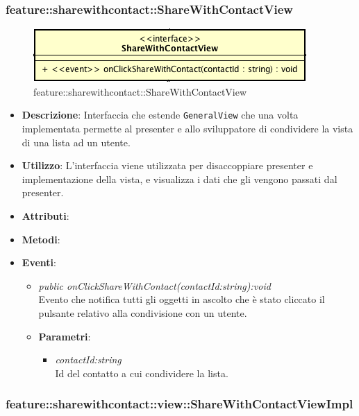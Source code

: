 \subsubsection{feature::sharewithcontact::ShareWithContactView}

\label{feature::sharewithcontact::ShareWithContactView}
\begin{figure}[ht]
	\centering
	\includegraphics[scale=0.5]{Sezioni/SottosezioniST/img/app/ShareWithContactView.png}
	\caption{feature::sharewithcontact::ShareWithContactView}
\end{figure}

\begin{itemize}
\item \textbf{Descrizione}: Interfaccia che estende \texttt{GeneralView} che una volta implementata permette al presenter e allo sviluppatore di condividere la vista di una lista ad un utente.
\item \textbf{Utilizzo}: L'interfaccia viene utilizzata per disaccoppiare presenter e implementazione della vista, e visualizza i dati che gli vengono passati dal presenter.
\item \textbf{Attributi}: 
\item \textbf{Metodi}:
\item \textbf{Eventi}:
\begin{itemize}
\item \textit{public onClickShareWithContact(contactId:string):void}\\
	Evento che notifica tutti gli oggetti in ascolto che è stato cliccato il pulsante relativo alla condivisione con un utente.
	\item{\textbf{Parametri}: \begin{itemize}
	\item \textit{contactId:string}\\
	Id del contatto a cui condividere la lista.
	\end{itemize}}
\end{itemize}
\end{itemize}

\subsubsection{feature::sharewithcontact::view::ShareWithContactViewImpl}

